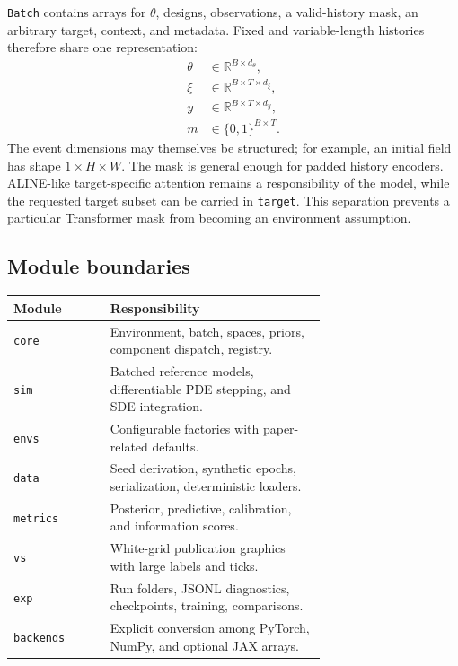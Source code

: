 \documentclass[11pt]{article}
\begin{document}
\texttt{Batch} contains arrays for $\theta$, designs, observations, a valid-history
mask, an arbitrary target, context, and metadata. Fixed and variable-length histories
therefore share one representation:
\begin{align}
 \theta &\in \mathbb{R}^{B\times d_\theta}, \\
 \xi &\in \mathbb{R}^{B\times T\times d_\xi}, \\
 y &\in \mathbb{R}^{B\times T\times d_y}, \\
 m &\in \{0,1\}^{B\times T}.
\end{align}
The event dimensions may themselves be structured; for example, an initial field has
shape $1\times H\times W$. The mask is general enough for padded history encoders.
ALINE-like target-specific attention remains a responsibility of the model, while the
requested target subset can be carried in \texttt{target}. This separation prevents a
particular Transformer mask from becoming an environment assumption.

\subsection{Module boundaries}

\begin{center}
\begin{tabular}{lp{0.69\linewidth}}
\toprule
Module & Responsibility \\
\midrule
\texttt{core} & Environment, batch, spaces, priors, component dispatch, registry. \\
\texttt{sim} & Batched reference models, differentiable PDE stepping, and SDE integration. \\
\texttt{envs} & Configurable factories with paper-related defaults. \\
\texttt{data} & Seed derivation, synthetic epochs, serialization, deterministic loaders. \\
\texttt{metrics} & Posterior, predictive, calibration, and information scores. \\
\texttt{vs} & White-grid publication graphics with large labels and ticks. \\
\texttt{exp} & Run folders, JSONL diagnostics, checkpoints, training, comparisons. \\
\texttt{backends} & Explicit conversion among PyTorch, NumPy, and optional JAX arrays. \\
\bottomrule
\end{tabular}
\end{center}
\end{document}
